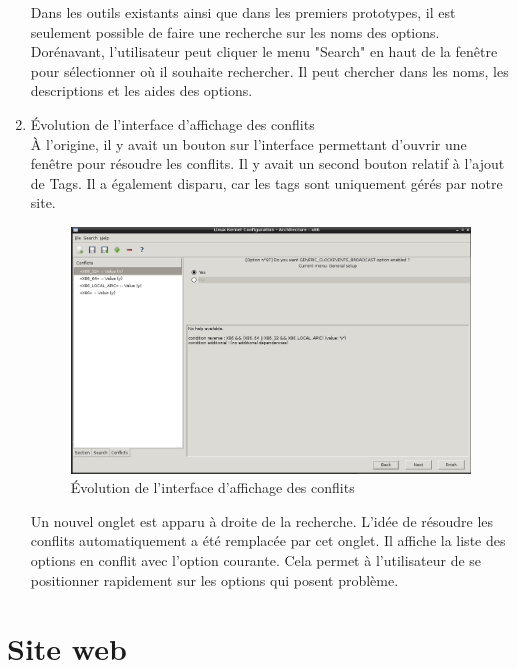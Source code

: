 \documentclass[16pts]{report}
\begin{document}
\begin{enumerate}
    Dans les outils existants ainsi que dans les premiers prototypes, il est
    seulement possible de faire une recherche sur les noms des options. 
	Dorénavant, l'utilisateur peut cliquer le menu "Search" en haut de la 
	fenêtre pour sélectionner où il souhaite rechercher. Il peut chercher dans 
	les noms, les descriptions et les aides des options.
	\\

	\pagebreak	

	\item Évolution de l'interface d'affichage des conflits
	\\

	À l'origine, il y avait un bouton sur l'interface permettant d'ouvrir 
	une fenêtre pour résoudre les conflits. Il y avait un second bouton relatif 
	à l'ajout de Tags. Il a également disparu, car les tags sont uniquement 
	gérés par notre site.  


	\begin{figure}[H]
		\includegraphics[scale=0.5]{./illustrations/screen_options_conflits_interface.png}
		\centering
		\caption{Évolution de l'interface d'affichage des conflits}
		\label{fig:Evo_config}
	\end{figure}

	Un nouvel onglet est apparu à droite de la recherche. L'idée de résoudre 
	les conflits automatiquement a été remplacée par cet onglet. Il affiche 
	la liste des options en conflit avec l'option courante. Cela permet à 
	l'utilisateur de se positionner rapidement sur les options qui posent 
	problème. 
	\\
\end{enumerate}

	\newpage
    \section{Site web}
    \label{sec:Site web}
\end{document}
